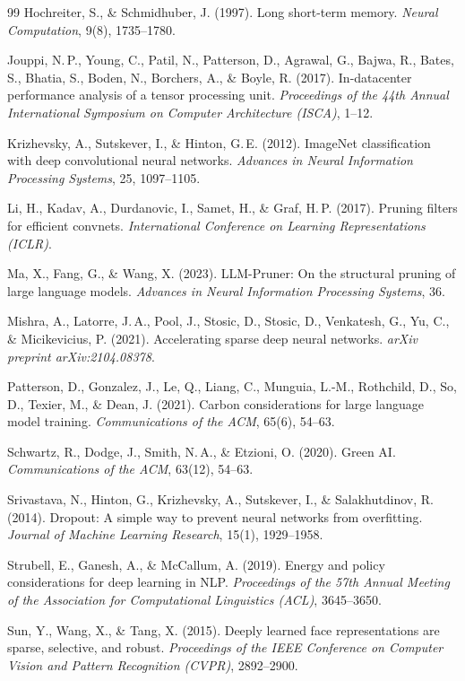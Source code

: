 ﻿\documentclass[12pt, a4paper, openany]{report}
\begin{document}
\begin{thebibliography}{99}
Hochreiter, S., \& Schmidhuber, J. (1997).
Long short-term memory.
\textit{Neural Computation}, 9(8), 1735--1780.

Jouppi, N.\,P., Young, C., Patil, N., Patterson, D., Agrawal, G.,
Bajwa, R., Bates, S., Bhatia, S., Boden, N., Borchers, A., \& Boyle, R. (2017).
In-datacenter performance analysis of a tensor processing unit.
\textit{Proceedings of the 44th Annual International Symposium on
Computer Architecture (ISCA)}, 1--12.

Krizhevsky, A., Sutskever, I., \& Hinton, G.\,E. (2012).
ImageNet classification with deep convolutional neural networks.
\textit{Advances in Neural Information Processing Systems}, 25, 1097--1105.

Li, H., Kadav, A., Durdanovic, I., Samet, H., \& Graf, H.\,P. (2017).
Pruning filters for efficient convnets.
\textit{International Conference on Learning Representations (ICLR)}.

Ma, X., Fang, G., \& Wang, X. (2023).
LLM-Pruner: On the structural pruning of large language models.
\textit{Advances in Neural Information Processing Systems}, 36.

Mishra, A., Latorre, J.\,A., Pool, J., Stosic, D., Stosic, D.,
Venkatesh, G., Yu, C., \& Micikevicius, P. (2021).
Accelerating sparse deep neural networks.
\textit{arXiv preprint arXiv:2104.08378}.

Patterson, D., Gonzalez, J., Le, Q., Liang, C., Munguia, L.-M.,
Rothchild, D., So, D., Texier, M., \& Dean, J. (2021).
Carbon considerations for large language model training.
\textit{Communications of the ACM}, 65(6), 54--63.

Schwartz, R., Dodge, J., Smith, N.\,A., \& Etzioni, O. (2020).
Green AI.
\textit{Communications of the ACM}, 63(12), 54--63.

Srivastava, N., Hinton, G., Krizhevsky, A., Sutskever, I., \&
Salakhutdinov, R. (2014).
Dropout: A simple way to prevent neural networks from overfitting.
\textit{Journal of Machine Learning Research}, 15(1), 1929--1958.

Strubell, E., Ganesh, A., \& McCallum, A. (2019).
Energy and policy considerations for deep learning in NLP.
\textit{Proceedings of the 57th Annual Meeting of the Association for
Computational Linguistics (ACL)}, 3645--3650.

Sun, Y., Wang, X., \& Tang, X. (2015).
Deeply learned face representations are sparse, selective, and robust.
\textit{Proceedings of the IEEE Conference on Computer Vision and Pattern
Recognition (CVPR)}, 2892--2900.


\end{thebibliography}
\end{document}
